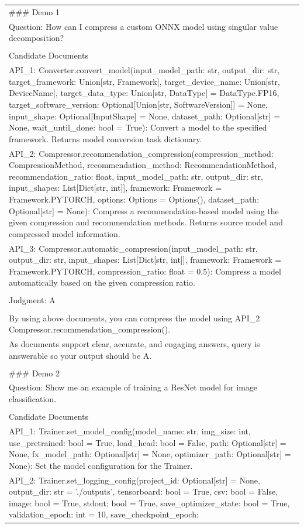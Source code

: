\begin{table}[h!]
\small  %
\centering
\begin{tabularx}{\textwidth}{|X|}
\hline
\#\#\# Demo 1\\ Question: How can I compress a custom ONNX model using singular value decomposition?\\ \\ Candidate Documents\\ API\_1: Converter.convert\_model(input\_model\_path: str, output\_dir: str, target\_framework: Union{[}str, Framework{]}, target\_device\_name: Union{[}str, DeviceName{]}, target\_data\_type: Union{[}str, DataType{]} = DataType.FP16, target\_software\_version: Optional{[}Union{[}str, SoftwareVersion{]}{]} = None, input\_shape: Optional{[}InputShape{]} = None, dataset\_path: Optional{[}str{]} = None, wait\_until\_done: bool = True): Convert a model to the specified framework. Returns model conversion task dictionary.\\ API\_2: Compressor.recommendation\_compression(compression\_method: CompressionMethod, recommendation\_method: RecommendationMethod, recommendation\_ratio: float, input\_model\_path: str, output\_dir: str, input\_shapes: List{[}Dict{[}str, int{]}{]}, framework: Framework = Framework.PYTORCH, options: Options = Options(), dataset\_path: Optional{[}str{]} = None): Compress a recommendation-based model using the given compression and recommendation methods. Returns source model and compressed model information.\\ API\_3: Compressor.automatic\_compression(input\_model\_path: str, output\_dir: str, input\_shapes: List{[}Dict{[}str, int{]}{]}, framework: Framework = Framework.PYTORCH, compression\_ratio: float = 0.5): Compress a model automatically based on the given compression ratio.\\ \\ Judgment: A\\ \\ By using above documents, you can compress the model using API\_2 Compressor.recommendation\_compression().\\ As documents support clear, accurate, and engaging answers, query is answerable so your output should be A.\\ \\ \#\#\# Demo 2\\ Question: Show me an example of training a ResNet model for image classification.\\ \\ Candidate Documents\\ API\_1: Trainer.set\_model\_config(model\_name: str, img\_size: int, use\_pretrained: bool = True, load\_head: bool = False, path: Optional{[}str{]} = None, fx\_model\_path: Optional{[}str{]} = None, optimizer\_path: Optional{[}str{]} = None): Set the model configuration for the Trainer.\\ API\_2: Trainer.set\_logging\_config(project\_id: Optional{[}str{]} = None, output\_dir: str = './outputs', tensorboard: bool = True, csv: bool = False, image: bool = True, stdout: bool = True, save\_optimizer\_state: bool = True, validation\_epoch: int = 10, save\_checkpoint\_epoch: 
\end{tabularx}
\end{table}
